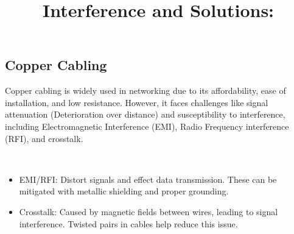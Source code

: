 \documentclass[a4paper,11pt]{article}
\begin{document}
\subsection{Copper Cabling}
Copper cabling is widely used in networking due to its affordability, ease of installation, and low resistance. However, it faces challenges like signal attenuation (Deterioration over distance) and susceptibility to interference, including Electromagnetic Interference (EMI), Radio Frequency interference (RFI), and crosstalk.\\

\title{Interference and Solutions:}\\
\begin{itemize}
    \item EMI/RFI: Distort signals and effect data transmission. These can be mitigated with metallic shielding and proper grounding.\\
    \item Crosstalk: Caused by magnetic fields between wires, leading to signal interference. Twisted pairs in cables help reduce this issue.\\
\end{itemize}
\end{document}
